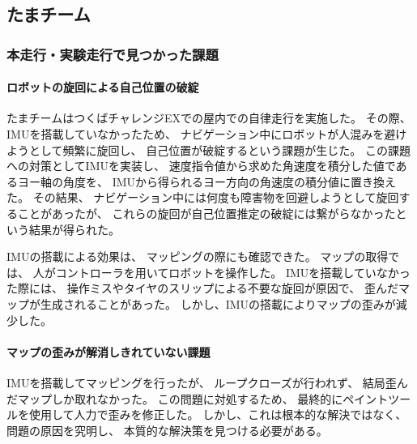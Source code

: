 \documentclass[twocolumn,9pt]{jsproceedings}
\begin{document}

\subsection{たまチーム}
\subsubsection{本走行・実験走行で見つかった課題}
\paragraph{ロボットの旋回による自己位置の破綻}


たまチームはつくばチャレンジEXでの屋内での自律走行を実施した。
その際、IMUを搭載していなかったため、
ナビゲーション中にロボットが人混みを避けようとして頻繁に旋回し、
自己位置が破綻するという課題が生じた。
この課題への対策としてIMUを実装し、
速度指令値から求めた角速度を積分した値であるヨー軸の角度を、
IMUから得られるヨー方向の角速度の積分値に置き換えた。
その結果、
ナビゲーション中には何度も障害物を回避しようとして旋回することがあったが、
これらの旋回が自己位置推定の破綻には繋がらなかったという結果が得られた。


IMUの搭載による効果は、
マッピングの際にも確認できた。
マップの取得では、
人がコントローラを用いてロボットを操作した。
IMUを搭載していなかった際には、
操作ミスやタイヤのスリップによる不要な旋回が原因で、
歪んだマップが生成されることがあった。
しかし、IMUの搭載によりマップの歪みが減少した。


\paragraph{マップの歪みが解消しきれていない課題}


IMUを搭載してマッピングを行ったが、
ループクローズが行われず、
結局歪んだマップしか取れなかった。
この問題に対処するため、
最終的にペイントツールを使用して人力で歪みを修正した。
しかし、これは根本的な解決ではなく、
問題の原因を究明し、
本質的な解決策を見つける必要がある。
\end{document}
